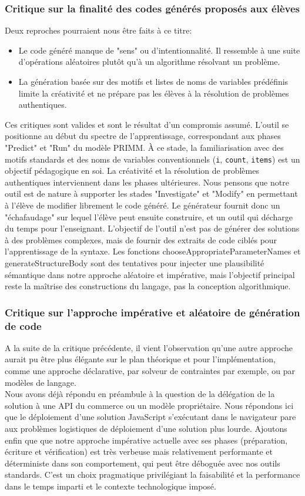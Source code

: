 \documentclass[11pt,a4paper]{article}
\begin{document}
\subsubsection*{Critique sur la finalité des codes générés proposés aux élèves}
Deux reproches pourraient nous être faits à ce titre:
\begin{itemize}
    \item Le code généré manque de "sens" ou d'intentionnalité. Il ressemble à une suite d'opérations aléatoires plutôt qu'à un algorithme résolvant un problème.
    \item La génération basée sur des motifs et listes de noms de variables prédéfinis limite la créativité et ne prépare pas les élèves à la résolution de problèmes authentiques.
\end{itemize}
Ces critiques sont valides et sont le résultat d'un compromis assumé. L'outil se positionne au début du spectre de l'apprentissage, correspondant aux phases "Predict" et "Run" du modèle PRIMM. À ce stade, la familiarisation avec des motifs standards et des noms de variables conventionnels (\texttt{i}, \texttt{count}, \texttt{items}) est un objectif pédagogique en soi. La créativité et la résolution de problèmes authentiques interviennent dans les phases ultérieures. Nous pensons que notre outil est de nature à supporter les stades "Investigate" et "Modify" en permettant à l'élève de modifier librement le code généré. Le générateur fournit donc un "échafaudage" sur lequel l'élève peut ensuite construire, et un outil qui décharge du temps pour l'enseignant. L'objectif de l'outil n'est pas de générer des solutions à des problèmes complexes, mais de fournir des extraits de code ciblés pour l'apprentissage de la syntaxe. Les fonctions chooseAppropriateParameterNames et generateStructureBody sont des tentatives pour injecter une plausibilité sémantique dans notre approche aléatoire et impérative, mais l'objectif principal reste la maîtrise des constructions du langage, pas la conception algorithmique.

\subsubsection*{Critique sur l'approche impérative et aléatoire de génération de code}
A la suite de la critique précédente, il vient l'observation qu'une autre approche aurait pu être plus élégante sur le plan théorique et pour l'implémentation, comme une approche déclarative, par solveur de contraintes par exemple, ou par modèles de langage. \\ 
Nous avons déjà répondu en préambule à la question de la délégation de la solution à une API du commerce ou un modèle propriétaire. Nous répondons ici que le déploiement d'une solution JavaScript s'exécutant dans le navigateur pare aux problèmes logistiques de déploiement d'une solution plus lourde. Ajoutons enfin que que notre approche impérative actuelle avec ses phases (préparation, écriture et vérification) est très verbeuse mais relativement performante et déterministe dans son comportement, qui peut être déboguée avec nos outils standards. C'est un choix pragmatique privilégiant la faisabilité et la performance dans le temps imparti et le contexte technologique imposé.
\end{document}
